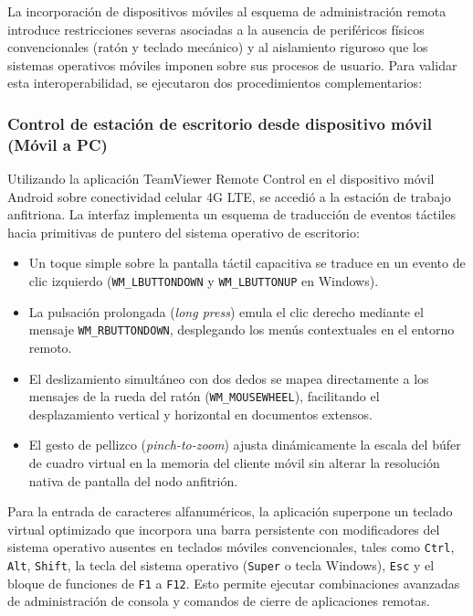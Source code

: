 \documentclass[12pt]{article}
\begin{document}
La incorporación de dispositivos móviles al esquema de administración remota introduce restricciones severas asociadas a la ausencia de periféricos físicos convencionales (ratón y teclado mecánico) y al aislamiento riguroso que los sistemas operativos móviles imponen sobre sus procesos de usuario. Para validar esta interoperabilidad, se ejecutaron dos procedimientos complementarios:

\subsubsection{Control de estación de escritorio desde dispositivo móvil (Móvil a PC)}

Utilizando la aplicación TeamViewer Remote Control en el dispositivo móvil Android sobre conectividad celular 4G LTE, se accedió a la estación de trabajo anfitriona. La interfaz implementa un esquema de traducción de eventos táctiles hacia primitivas de puntero del sistema operativo de escritorio:
\begin{itemize}[noitemsep, topsep=4pt]
    \item Un toque simple sobre la pantalla táctil capacitiva se traduce en un evento de clic izquierdo (\texttt{WM\_LBUTTONDOWN} y \texttt{WM\_LBUTTONUP} en Windows).
    \item La pulsación prolongada (\textit{long press}) emula el clic derecho mediante el mensaje \texttt{WM\_\allowbreak RBUTTONDOWN}, desplegando los menús contextuales en el entorno remoto.
    \item El deslizamiento simultáneo con dos dedos se mapea directamente a los mensajes de la rueda del ratón (\texttt{WM\_MOUSEWHEEL}), facilitando el desplazamiento vertical y horizontal en documentos extensos.
    \item El gesto de pellizco (\textit{pinch-to-zoom}) ajusta dinámicamente la escala del búfer de cuadro virtual en la memoria del cliente móvil sin alterar la resolución nativa de pantalla del nodo anfitrión.
\end{itemize}

Para la entrada de caracteres alfanuméricos, la aplicación superpone un teclado virtual optimizado que incorpora una barra persistente con modificadores del sistema operativo ausentes en teclados móviles convencionales, tales como \texttt{Ctrl}, \texttt{Alt}, \texttt{Shift}, la tecla del sistema operativo (\texttt{Super} o tecla Windows), \texttt{Esc} y el bloque de funciones de \texttt{F1} a \texttt{F12}. Esto permite ejecutar combinaciones avanzadas de administración de consola y comandos de cierre de aplicaciones remotas.
\end{document}

